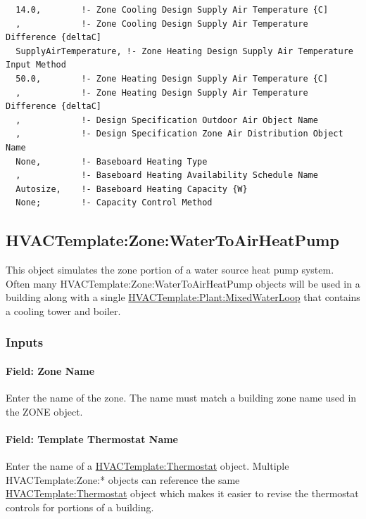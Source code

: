 \begin{lstlisting}
  14.0,        !- Zone Cooling Design Supply Air Temperature {C]
  ,            !- Zone Cooling Design Supply Air Temperature Difference {deltaC]
  SupplyAirTemperature, !- Zone Heating Design Supply Air Temperature Input Method
  50.0,        !- Zone Heating Design Supply Air Temperature {C]
  ,            !- Zone Heating Design Supply Air Temperature Difference {deltaC]
  ,            !- Design Specification Outdoor Air Object Name
  ,            !- Design Specification Zone Air Distribution Object Name
  None,        !- Baseboard Heating Type
  ,            !- Baseboard Heating Availability Schedule Name
  Autosize,    !- Baseboard Heating Capacity {W}
  None;        !- Capacity Control Method
\end{lstlisting}

\subsection{HVACTemplate:Zone:WaterToAirHeatPump}\label{hvactemplatezonewatertoairheatpump}

This object simulates the zone portion of a water source heat pump system. Often many HVACTemplate:Zone:WaterToAirHeatPump objects will be used in a building along with a single \hyperref[hvactemplateplantmixedwaterloop]{HVACTemplate:Plant:MixedWaterLoop} that contains a cooling tower and boiler.

\subsubsection{Inputs}\label{inputs-6-011}

\paragraph{Field: Zone Name}\label{field-zone-name-5-001}

Enter the name of the zone. The name must match a building zone name used in the ZONE object.

\paragraph{Field: Template Thermostat Name}\label{field-template-thermostat-name-5}

Enter the name of a \hyperref[hvactemplatethermostat]{HVACTemplate:Thermostat} object. Multiple HVACTemplate:Zone:* objects can reference the same \hyperref[hvactemplatethermostat]{HVACTemplate:Thermostat} object which makes it easier to revise the thermostat controls for portions of a building.

